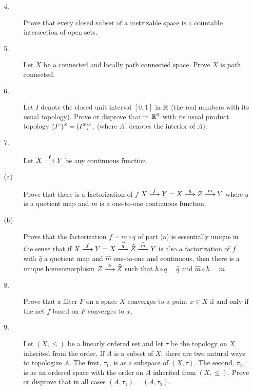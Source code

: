 \documentclass[bbb]{report}
\def\R{{\Bbb R}}
\begin{document}
\begin{large}
\begin{description}
\vspace{.15in}
\item[4.]
Prove that every closed subset of a metrizable space is a
countable intersection of open sets.


\vspace{.15in}
\item[5.]
Let $X$ be a connected and locally path connected space. Prove
$X$ is path connected.


\vspace{.15in}
\item[6.]
Let $I$ denote the closed unit interval $[0,1]$ in $\R$
(the real numbers with its usual topology). Prove or disprove
that in $\R^{\R}$ with its usual product topology
$(I^\circ)^{\R}=(I^{\R})^\circ$, (where $A^\circ$ denotes the
interior of $A$).



\vspace{.15in}
\item[7.]
Let $X\buildrel{f}\over{\longrightarrow} Y$
be any continuous function.

\vspace{.1in}
\item[\quad (a)]
Prove that there is a factorization of $f$
$X\buildrel{f}\over{\longrightarrow}Y=
 X\buildrel{q}\over{\longrightarrow}Z\buildrel{m}\over{\longrightarrow}Y$
 where $q$ is a quotient map and $m$ is a one-to-one continuous
 function.

\item[\quad (b)]
Prove that the factorization $f=m\circ q$ of part (a) is essentially
unique in the sense that if
$X\buildrel{f}\over{\longrightarrow}Y=
 X\buildrel{\widehat q}\over{\longrightarrow}\widehat Z
  \buildrel{\widehat m}\over{\longrightarrow}Y$
is also a factorization of $f$ with $\widehat q$ a
quotient map and $\widehat m$ one-to-one and continuous,
then there is a unique homeomorphism
$Z\buildrel{h}\over{\longrightarrow}\widehat Z$
such that $h\circ q=\widehat q$ and $\widehat m\circ h=m$.

\vspace{.15in}
\item[8.]
Prove that a filter $F$ on a space $X$ converges to a point
$x\in X $ if and only if the net $f$ based on $F$ converges to $x$.

\vspace{.15in}
\item[9.]
Let $(X,\leq)$ be a linearly ordered set and let
$\tau$ be the topology on $X$ inherited from the order.
If $A$ is a subset of $X$, there are two natural ways to
topologize $A$. The first, $\tau_1$, is as a subspace of
$(X,\tau)$.
The second, $\tau_2$, is as an ordered space with the order on $A$
inherited from $(X,\leq)$. Prove or disprove that in all cases
$(A,\tau_1)=(A,\tau_2)$.


\end{description}
\end{large}
\end{document}
